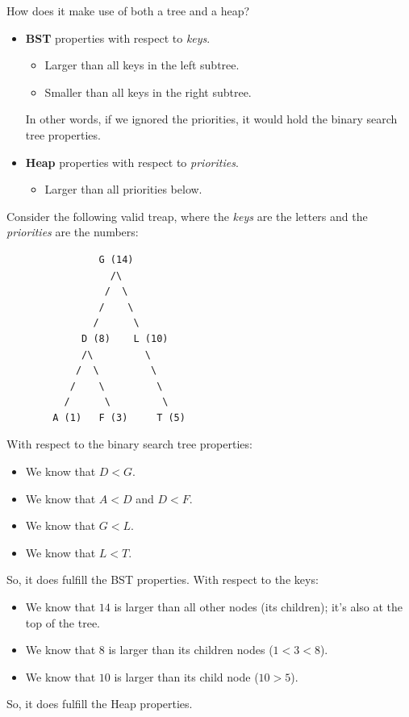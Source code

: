 \documentclass[letterpaper]{article}
\begin{document}
\bigskip 

How does it make use of both a tree and a heap? 
\begin{itemize}
    \item \textbf{BST} properties with respect to \emph{keys}.
    \begin{itemize}
        \item Larger than all keys in the left subtree. 
        \item Smaller than all keys in the right subtree. 
    \end{itemize}
    In other words, if we ignored the priorities, it would hold the binary search tree properties. 

    \item \textbf{Heap} properties with respect to \emph{priorities}. 
    \begin{itemize}
        \item Larger than all priorities below. 
    \end{itemize}
\end{itemize}

Consider the following valid treap, where the \emph{keys} are the letters and the \emph{priorities} are the numbers: 
\begin{verbatim}
                G (14)
                  /\ 
                 /  \ 
                /    \ 
               /      \ 
             D (8)    L (10)
             /\         \ 
            /  \         \ 
           /    \         \ 
          /      \         \ 
        A (1)   F (3)     T (5)
\end{verbatim}
With respect to the binary search tree properties: 
\begin{itemize}
    \item We know that $D < G$. 
    \item We know that $A < D$ and $D < F$. 
    \item We know that $G < L$. 
    \item We know that $L < T$. 
\end{itemize}
So, it does fulfill the BST properties. With respect to the keys: 
\begin{itemize}
    \item We know that $14$ is larger than all other nodes (its children); it's also at the top of the tree. 
    \item We know that $8$ is larger than its children nodes ($1 < 3 < 8$). 
    \item We know that $10$ is larger than its child node ($10 > 5$). 
\end{itemize}
So, it does fulfill the Heap properties. 
\end{document}

